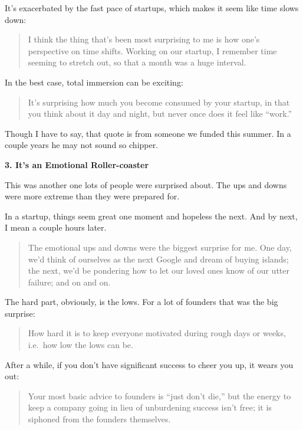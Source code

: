 It's exacerbated by the fast pace of startups, which makes it seem like
time slows down:

\begin{quote}
I think the thing that's been most surprising to me is how one's
perspective on time shifts. Working on our startup, I remember time
seeming to stretch out, so that a month was a huge interval.
\end{quote}

In the best case, total immersion can be exciting:

\begin{quote}
It's surprising how much you become consumed by your startup, in that
you think about it day and night, but never once does it feel like
``work.''
\end{quote}

Though I have to say, that quote is from someone we funded this summer.
In a couple years he may not sound so chipper.

\textbf{3. It's an Emotional Roller-coaster}

This was another one lots of people were surprised about. The ups and
downs were more extreme than they were prepared for.

In a startup, things seem great one moment and hopeless the next. And by
next, I mean a couple hours later.

\begin{quote}
The emotional ups and downs were the biggest surprise for me. One day,
we'd think of ourselves as the next Google and dream of buying islands;
the next, we'd be pondering how to let our loved ones know of our utter
failure; and on and on.
\end{quote}

The hard part, obviously, is the lows. For a lot of founders that was
the big surprise:

\begin{quote}
How hard it is to keep everyone motivated during rough days or weeks,
i.e.~how low the lows can be.
\end{quote}

After a while, if you don't have significant success to cheer you up, it
wears you out:

\begin{quote}
Your most basic advice to founders is ``just don't die,'' but the energy
to keep a company going in lieu of unburdening success isn't free; it is
siphoned from the founders themselves.
\end{quote}

